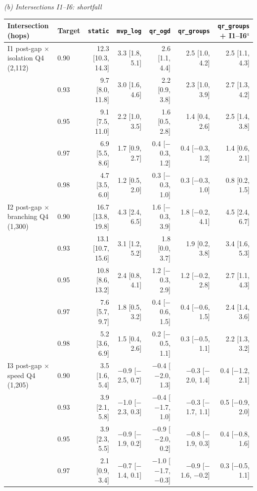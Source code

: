 \par\medskip
\emph{(b) Intersections I1--I6: shortfall}\par\smallskip
\begin{tabular}{@{}llrrrrr@{}}
\toprule
Intersection (hops) & Target & \texttt{static} & \texttt{mvp\_log} & \texttt{qr\_ogd} & \texttt{qr\_groups} & \texttt{qr\_groups} + I1--I6$^{a}$ \\
\midrule
I1 post-gap $\times$ isolation Q4 (2{,}112) & 0.90 & 12.3 [10.3, 14.3] & 3.3 [1.8, 5.1] & 2.6 [1.1, 4.4] & 2.5 [1.0, 4.2] & 2.5 [1.1, 4.3] \\
 & 0.93 & 9.7 [8.0, 11.8] & 3.0 [1.6, 4.6] & 2.2 [0.9, 3.8] & 2.3 [1.0, 3.9] & 2.7 [1.3, 4.2] \\
 & 0.95 & 9.1 [7.5, 11.0] & 2.2 [1.0, 3.5] & 1.6 [0.5, 2.8] & 1.4 [0.4, 2.6] & 2.5 [1.4, 3.8] \\
 & 0.97 & 6.9 [5.5, 8.6] & 1.7 [0.9, 2.7] & 0.4 [$-$0.3, 1.2] & 0.4 [$-$0.3, 1.2] & 1.4 [0.6, 2.1] \\
 & 0.98 & 4.7 [3.5, 6.0] & 1.2 [0.5, 2.0] & 0.3 [$-$0.3, 1.0] & 0.3 [$-$0.3, 1.0] & 0.8 [0.2, 1.5] \\
\addlinespace[2pt]
I2 post-gap $\times$ branching Q4 (1{,}300) & 0.90 & 16.7 [13.8, 19.8] & 4.3 [2.4, 6.5] & 1.6 [$-$0.3, 3.9] & 1.8 [$-$0.2, 4.1] & 4.5 [2.4, 6.7] \\
 & 0.93 & 13.1 [10.7, 15.6] & 3.1 [1.2, 5.2] & 1.8 [0.0, 3.7] & 1.9 [0.2, 3.8] & 3.4 [1.6, 5.3] \\
 & 0.95 & 10.8 [8.6, 13.2] & 2.4 [0.8, 4.1] & 1.2 [$-$0.3, 2.9] & 1.2 [$-$0.2, 2.8] & 2.7 [1.1, 4.3] \\
 & 0.97 & 7.6 [5.7, 9.7] & 1.8 [0.5, 3.2] & 0.4 [$-$0.6, 1.5] & 0.4 [$-$0.6, 1.5] & 2.4 [1.4, 3.6] \\
 & 0.98 & 5.2 [3.6, 6.9] & 1.5 [0.4, 2.6] & 0.2 [$-$0.5, 1.1] & 0.3 [$-$0.5, 1.1] & 2.2 [1.3, 3.2] \\
\addlinespace[2pt]
I3 post-gap $\times$ speed Q4 (1{,}205) & 0.90 & 3.5 [1.6, 5.4] & $-$0.9 [$-$2.5, 0.7] & $-$0.4 [$-$2.0, 1.3] & $-$0.3 [$-$2.0, 1.4] & 0.4 [$-$1.2, 2.1] \\
 & 0.93 & 3.9 [2.1, 5.8] & $-$1.0 [$-$2.3, 0.3] & $-$0.4 [$-$1.7, 1.0] & $-$0.3 [$-$1.7, 1.1] & 0.5 [$-$0.9, 2.0] \\
 & 0.95 & 3.9 [2.3, 5.5] & $-$0.9 [$-$1.9, 0.2] & $-$0.9 [$-$2.0, 0.2] & $-$0.8 [$-$1.9, 0.3] & 0.4 [$-$0.8, 1.6] \\
 & 0.97 & 2.1 [0.9, 3.4] & $-$0.7 [$-$1.4, 0.1] & $-$1.0 [$-$1.7, $-$0.3] & $-$0.9 [$-$1.6, $-$0.2] & 0.3 [$-$0.5, 1.1] \\

\end{tabular}
